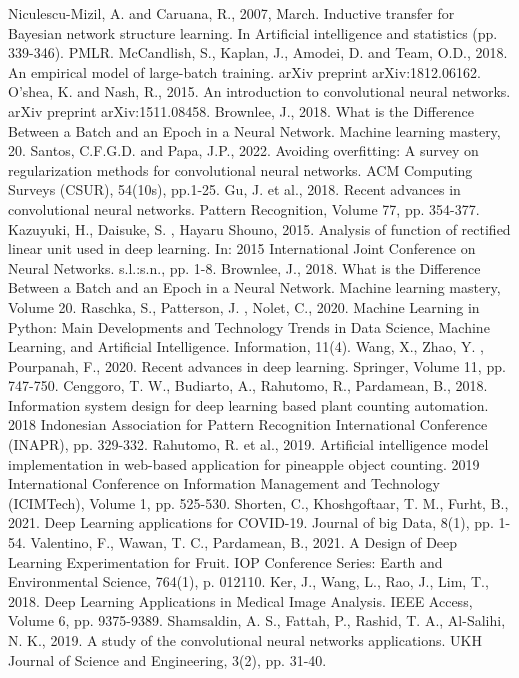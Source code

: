 \documentclass[conference]{IEEEtran}
\begin{document}
\begin{thebibliography}{00}
 Niculescu-Mizil, A. and Caruana, R., 2007, March. Inductive transfer for Bayesian network structure learning. In Artificial intelligence and statistics (pp. 339-346). PMLR.
 McCandlish, S., Kaplan, J., Amodei, D. and Team, O.D., 2018. An empirical model of large-batch training. arXiv preprint arXiv:1812.06162.
 O'shea, K. and Nash, R., 2015. An introduction to convolutional neural networks. arXiv preprint arXiv:1511.08458.
 Brownlee, J., 2018. What is the Difference Between a Batch and an Epoch in a Neural Network. Machine learning mastery, 20.
 Santos, C.F.G.D. and Papa, J.P., 2022. Avoiding overfitting: A survey on regularization methods for convolutional neural networks. ACM Computing Surveys (CSUR), 54(10s), pp.1-25.
 Gu, J. et al., 2018. Recent advances in convolutional neural networks. Pattern Recognition, Volume 77, pp. 354-377.
 Kazuyuki, H., Daisuke, S. , Hayaru Shouno, 2015. Analysis of function of rectified linear unit used in deep learning. In: 2015 International Joint Conference on Neural Networks. s.l.:s.n., pp. 1-8.
 Brownlee, J., 2018. What is the Difference Between a Batch and an Epoch in a Neural Network. Machine learning mastery, Volume 20.
 Raschka, S., Patterson, J. , Nolet, C., 2020. Machine Learning in Python: Main Developments and Technology Trends in Data Science, Machine Learning, and Artificial Intelligence. Information, 11(4).
 Wang, X., Zhao, Y. , Pourpanah, F., 2020. Recent advances in deep learning. Springer, Volume 11, pp. 747-750.
 Cenggoro, T. W., Budiarto, A., Rahutomo, R., Pardamean, B., 2018. Information system design for deep learning based plant counting automation. 2018 Indonesian Association for Pattern Recognition International Conference (INAPR), pp. 329-332.
 Rahutomo, R. et al., 2019. Artificial intelligence model implementation in web-based application for pineapple object counting. 2019 International Conference on Information Management and Technology (ICIMTech), Volume 1, pp. 525-530.
 Shorten, C., Khoshgoftaar, T. M., Furht, B., 2021. Deep Learning applications for COVID-19. Journal of big Data, 8(1), pp. 1-54.
 Valentino, F., Wawan, T. C., Pardamean, B., 2021. A Design of Deep Learning  Experimentation for Fruit. IOP Conference Series: Earth and Environmental Science, 764(1), p. 012110.
Ker, J., Wang, L., Rao, J., Lim, T., 2018. Deep Learning Applications in Medical Image Analysis. IEEE Access, Volume 6, pp. 9375-9389.
 Shamsaldin, A. S., Fattah, P., Rashid, T. A., Al-Salihi, N. K., 2019. A study of the convolutional neural networks applications. UKH Journal of Science and Engineering, 3(2), pp. 31-40.
\end{thebibliography}
\end{document}
